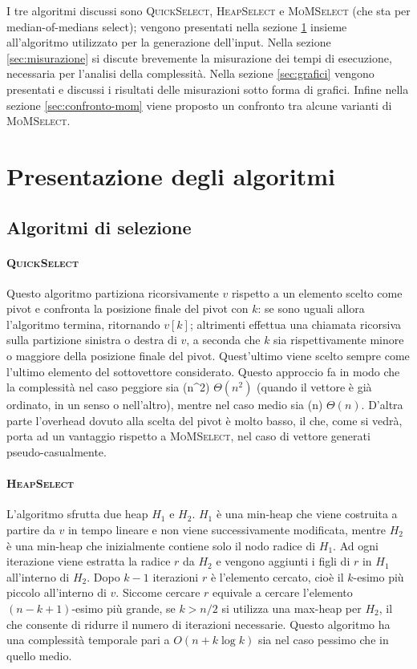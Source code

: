 \documentclass[a4paper]{article}
\newcommand{\QuickSelect}{\textsc{QuickSelect}}
\newcommand{\HeapSelect}{\textsc{HeapSelect}}
\newcommand{\MoMSelect}{\textsc{MoMSelect}}
\newcommand{\Tquad}{\ifmmode \Theta(n^2) \else $\Theta(n^2)$\fi} %
\newcommand{\Tlin}{\ifmmode \Theta(n) \else $\Theta(n)$\fi} %
\begin{document}
I tre algoritmi discussi sono \QuickSelect{}, \HeapSelect{} e \MoMSelect{} (che sta per median-of-medians select); vengono presentati nella sezione \ref{sec:presentazione-algoritmi} insieme all'algoritmo utilizzato per la generazione dell'input.
Nella sezione \ref{sec:misurazione} si discute brevemente la misurazione dei tempi di esecuzione, necessaria per l'analisi della complessità.
Nella sezione \ref{sec:grafici} vengono presentati e discussi i risultati delle misurazioni sotto forma di grafici.
Infine nella sezione \ref{sec:confronto-mom} viene proposto un confronto tra alcune varianti di \MoMSelect{}.



\section{Presentazione degli algoritmi}
\label{sec:presentazione-algoritmi}

\subsection{Algoritmi di selezione}
\paragraph{\QuickSelect}
Questo algoritmo partiziona ricorsivamente $v$ rispetto a un elemento scelto come pivot e confronta la posizione finale del pivot con $k$: se sono uguali allora l'algoritmo termina, ritornando $v[k]$; altrimenti effettua una chiamata ricorsiva sulla partizione sinistra o destra di $v$, a seconda che $k$ sia rispettivamente minore o maggiore della posizione finale del pivot.
Quest'ultimo viene scelto sempre come l'ultimo elemento del sottovettore considerato.
Questo approccio fa in modo che la complessità nel caso peggiore sia \Tquad{} (quando il vettore è già ordinato, in un senso o nell'altro), mentre nel caso medio sia \Tlin.
D'altra parte l'overhead dovuto alla scelta del pivot è molto basso, il che, come si vedrà, porta ad un vantaggio rispetto a \MoMSelect{}, nel caso di vettore generati pseudo-casualmente.

\paragraph{\HeapSelect}
L'algoritmo sfrutta due heap $H_1$ e $H_2$.
$H_1$ è una min-heap che viene costruita a partire da $v$ in tempo lineare e non viene successivamente modificata, mentre $H_2$ è una min-heap che inizialmente contiene solo il nodo radice di $H_1$.
Ad ogni iterazione viene estratta la radice $r$ da $H_2$ e vengono aggiunti i figli di $r$ in $H_1$ all'interno di $H_2$.
Dopo $k-1$ iterazioni $r$ è l'elemento cercato, cioè il $k$-esimo più piccolo all'interno di $v$.
Siccome cercare $r$ equivale a cercare l'elemento $(n-k+1)$-esimo più grande, se $k>n/2$ si utilizza una max-heap per $H_2$, il che consente di ridurre il numero di iterazioni necessarie.
Questo algoritmo ha una complessità temporale pari a $O(n+k\log k)$ sia nel caso pessimo che in quello medio.
\end{document}
